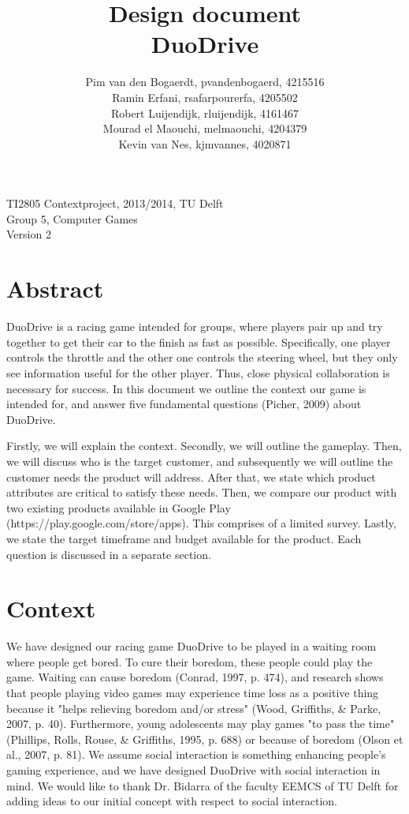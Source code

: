 \documentclass[11pt,twoside,a4paper]{article}
\title{
  Design document\\
  DuoDrive
}
\author{
	Pim van den Bogaerdt, pvandenbogaerd, 4215516\\
	Ramin Erfani, rsafarpourerfa, 4205502\\
	Robert Luijendijk, rluijendijk, 4161467\\
	Mourad el Maouchi, melmaouchi, 4204379\\
	Kevin van Nes, kjmvannes, 4020871
}
\begin{document}
\maketitle
\begin{center}
TI2805 Contextproject, 2013/2014, TU Delft\\
Group 5, Computer Games\\
Version 2
\end{center}
\clearpage

\section*{Abstract}
DuoDrive is a racing game intended for groups, where players pair up and try together to get their car to the finish as fast as possible. Specifically, one player controls the throttle and the other one controls the steering wheel, but they only see information useful for the other player. Thus, close physical collaboration is necessary for success. In this document we outline the context our game is intended for, and answer five fundamental questions (Picher, 2009) about DuoDrive.

Firstly, we will explain the context. Secondly, we will outline the gameplay. Then, we will discuss who is the target customer, and subsequently we will outline the customer needs the product will address. After that, we state which product attributes are critical to satisfy these needs. Then, we compare our product with two existing products available in Google Play (https://play.google.com/store/apps). This comprises of a limited survey. Lastly, we state the target timeframe and budget available for the product. Each question is discussed in a separate section.

\clearpage
\tableofcontents

\clearpage

\section{Context}
We have designed our racing game DuoDrive to be played in a waiting room where people get bored. To cure their boredom, these people could play the game. Waiting can cause boredom (Conrad, 1997, p. 474), and research shows that people playing video games may experience time loss as a positive thing because it "helps relieving boredom and/or stress" (Wood, Griffiths, \& Parke, 2007, p. 40). Furthermore, young adolescents may play games "to pass the time" (Phillips, Rolls, Rouse, \& Griffiths, 1995, p. 688) or because of boredom (Olson et al., 2007, p. 81). We assume social interaction is something enhancing people's gaming experience, and we have designed DuoDrive with social interaction in mind. We would like to thank Dr. Bidarra of the faculty EEMCS of TU Delft for adding ideas to our initial concept with respect to social interaction.
\end{document}
